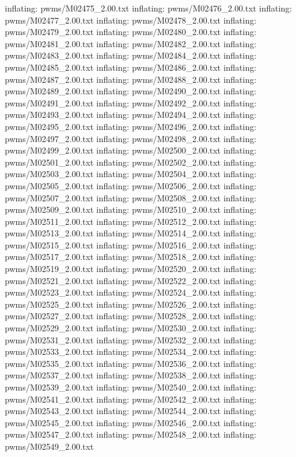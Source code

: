 \documentclass[letterpaper,10pt,english]{sphinxmanual}
\begin{document}
{\begin{sphinxVerbatim}[commandchars=\\\{\}]
  inflating: pwms/M02475\_2.00.txt
  inflating: pwms/M02476\_2.00.txt
  inflating: pwms/M02477\_2.00.txt
  inflating: pwms/M02478\_2.00.txt
  inflating: pwms/M02479\_2.00.txt
  inflating: pwms/M02480\_2.00.txt
  inflating: pwms/M02481\_2.00.txt
  inflating: pwms/M02482\_2.00.txt
  inflating: pwms/M02483\_2.00.txt
  inflating: pwms/M02484\_2.00.txt
  inflating: pwms/M02485\_2.00.txt
  inflating: pwms/M02486\_2.00.txt
  inflating: pwms/M02487\_2.00.txt
  inflating: pwms/M02488\_2.00.txt
  inflating: pwms/M02489\_2.00.txt
  inflating: pwms/M02490\_2.00.txt
  inflating: pwms/M02491\_2.00.txt
  inflating: pwms/M02492\_2.00.txt
  inflating: pwms/M02493\_2.00.txt
  inflating: pwms/M02494\_2.00.txt
  inflating: pwms/M02495\_2.00.txt
  inflating: pwms/M02496\_2.00.txt
  inflating: pwms/M02497\_2.00.txt
  inflating: pwms/M02498\_2.00.txt
  inflating: pwms/M02499\_2.00.txt
  inflating: pwms/M02500\_2.00.txt
  inflating: pwms/M02501\_2.00.txt
  inflating: pwms/M02502\_2.00.txt
  inflating: pwms/M02503\_2.00.txt
  inflating: pwms/M02504\_2.00.txt
  inflating: pwms/M02505\_2.00.txt
  inflating: pwms/M02506\_2.00.txt
  inflating: pwms/M02507\_2.00.txt
  inflating: pwms/M02508\_2.00.txt
  inflating: pwms/M02509\_2.00.txt
  inflating: pwms/M02510\_2.00.txt
  inflating: pwms/M02511\_2.00.txt
  inflating: pwms/M02512\_2.00.txt
  inflating: pwms/M02513\_2.00.txt
  inflating: pwms/M02514\_2.00.txt
  inflating: pwms/M02515\_2.00.txt
  inflating: pwms/M02516\_2.00.txt
  inflating: pwms/M02517\_2.00.txt
  inflating: pwms/M02518\_2.00.txt
  inflating: pwms/M02519\_2.00.txt
  inflating: pwms/M02520\_2.00.txt
  inflating: pwms/M02521\_2.00.txt
  inflating: pwms/M02522\_2.00.txt
  inflating: pwms/M02523\_2.00.txt
  inflating: pwms/M02524\_2.00.txt
  inflating: pwms/M02525\_2.00.txt
  inflating: pwms/M02526\_2.00.txt
  inflating: pwms/M02527\_2.00.txt
  inflating: pwms/M02528\_2.00.txt
  inflating: pwms/M02529\_2.00.txt
  inflating: pwms/M02530\_2.00.txt
  inflating: pwms/M02531\_2.00.txt
  inflating: pwms/M02532\_2.00.txt
  inflating: pwms/M02533\_2.00.txt
  inflating: pwms/M02534\_2.00.txt
  inflating: pwms/M02535\_2.00.txt
  inflating: pwms/M02536\_2.00.txt
  inflating: pwms/M02537\_2.00.txt
  inflating: pwms/M02538\_2.00.txt
  inflating: pwms/M02539\_2.00.txt
  inflating: pwms/M02540\_2.00.txt
  inflating: pwms/M02541\_2.00.txt
  inflating: pwms/M02542\_2.00.txt
  inflating: pwms/M02543\_2.00.txt
  inflating: pwms/M02544\_2.00.txt
  inflating: pwms/M02545\_2.00.txt
  inflating: pwms/M02546\_2.00.txt
  inflating: pwms/M02547\_2.00.txt
  inflating: pwms/M02548\_2.00.txt
  inflating: pwms/M02549\_2.00.txt

\end{sphinxVerbatim}}
\end{document}
